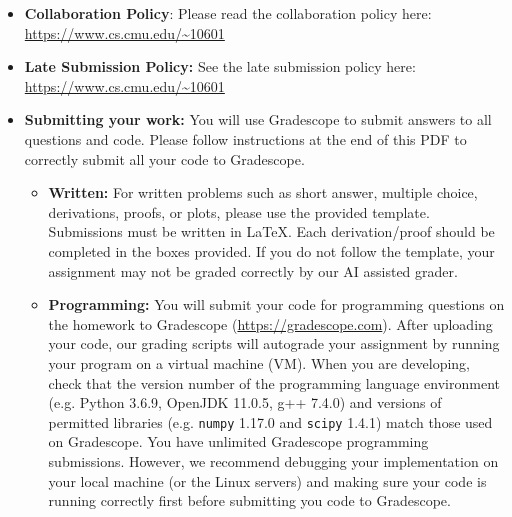 \documentclass[11pt,addpoints,answers]{exam}
\begin{document}
\begin{itemize}

\item \textbf{Collaboration Policy}: Please read the collaboration policy here: \url{https://www.cs.cmu.edu/~10601}

\item\textbf{Late Submission Policy:} See the late submission policy here: \url{https://www.cs.cmu.edu/~10601}

\item\textbf{Submitting your work:} You will use Gradescope to submit
  answers to all questions and code. Please
  follow instructions at the end of this PDF to correctly submit all your code to Gradescope.

  \begin{itemize}
    

    
   \item \textbf{Written:} For written problems such as short answer, multiple choice, derivations, proofs, or plots, please use the provided template. Submissions must be written in LaTeX.
   Each derivation/proof should be completed in the boxes provided. If you do not follow the template, your assignment may not be graded correctly by our AI assisted grader.

  \item \textbf{Programming:} You will submit your code for programming questions on the homework to Gradescope (\url{https://gradescope.com}). After uploading your code, our grading scripts will autograde your assignment by running your program on a virtual machine (VM). When you are developing, check that the version number of the programming language environment (e.g. Python 3.6.9, OpenJDK 11.0.5, g++ 7.4.0) and versions of permitted libraries (e.g.  \texttt{numpy} 1.17.0 and \texttt{scipy} 1.4.1) match those used on Gradescope. You have unlimited Gradescope programming submissions. However, we recommend debugging your implementation on your local machine (or the Linux servers) and making sure your code is running correctly first before submitting you code to Gradescope.


\end{itemize}
\end{itemize}
\end{document}

